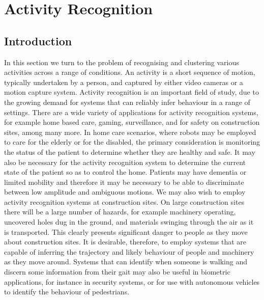 \chapter{Activity Recognition}
\label{activityRecognition}

\section{Introduction}

In this section we turn to the problem of recognising and clustering various activities across a range of conditions. An activity is a short sequence of motion, typically undertaken by a person, and captured by either video cameras or a motion capture system. Activity recognition is an important field of study, due to the growing demand for systems that can reliably infer behaviour in a range of settings. There are a wide variety of applications for activity recognition systems, for example home based care, gaming, surveillance, and for safety on construction sites, among many more. In home care scenarios, where robots may be employed to care for the elderly or for the disabled, the primary consideration is monitoring the status of the patient to determine whether they are healthy and safe. It may also be necessary for the activity recognition system to determine the current state of the patient so as to control the home. Patients may have dementia or limited mobility and therefore it may be necessary to be able to discriminate between low amplitude and ambiguous motions. We may also wish to employ activity recognition systems at construction sites. On large construction sites there will be a large number of hazards, for example machinery operating, uncovered holes dug in the ground, and materials swinging through the air as it is transported. This clearly presents significant danger to people as they move about construction sites. It is desirable, therefore, to employ systems that are capable of inferring the trajectory and likely behaviour of people and machinery as they move around. Systems that can identify when someone is walking and discern some information from their gait may also be useful in biometric applications, for instance in security systems, or for use with autonomous vehicles to identify the behaviour of pedestrians. \\

